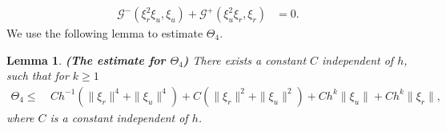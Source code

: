 \documentclass[11pt]{article}
\newcommand{\Gcal} {\mathcal{G}}
\newtheorem{lemma}{Lemma}[section]
\numberwithin{equation}{section}
\begin{document}
\begin{align}\label{eq:nonlinear:xi}
\Gcal^-(\xi_r^2\xi_u, \xi_u)+\Gcal^+(\xi_u^2\xi_r, \xi_r)&=0.
\end{align}
We use the following lemma to estimate $\Theta_4$.
\begin{lemma}\label{lemma:estimate4} {\bf{(The estimate for $\Theta_4$)}}
There exists a constant $C$ independent of $h$, such that for $k\geq1$
\begin{equation}\label{eq:est:theta4}
\begin{split}
\Theta_4\leq &~ Ch^{-1}(\|\xi_r\|^4+\|\xi_u\|^4)+C(\|\xi_r\|^2+\|\xi_u\|^2)+Ch^{k}\|\xi_u\|+Ch^{k}\|\xi_r\|,
\end{split}
\end{equation}
where $C$ is a constant independent of $h$.
\end{lemma}
\end{document}
